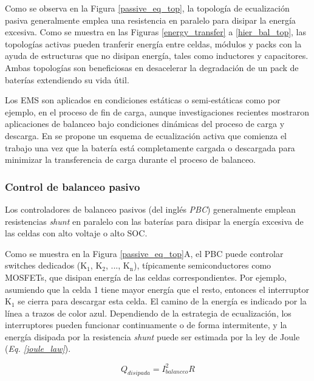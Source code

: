 \documentclass[10pt,a4paper]{article}
\begin{document}
Como se observa en la Figura \ref{passive_eq_top}, la topolog\'ia de
ecualizaci\'on pasiva generalmente emplea una resistencia en paralelo para
disipar la energ\'ia excesiva. Como se muestra en las Figuras
\ref{energy_transfer} a \ref{hier_bal_top}, las topolog\'ias activas pueden
tranferir energ\'ia entre celdas, m\'odulos y packs con la ayuda de estructuras
que no disipan energ\'ia, tales como inductores y capacitores. Ambas
topolog\'ias son beneficiosas en desacelerar la degradaci\'on de un pack de
bater\'ias extendiendo su vida \'util.

Los \acrshort{EMS} son aplicados en condiciones est\'aticas o semi-est\'aticas 
como por ejemplo, en el proceso de fin de carga, aunque investigaciones 
recientes mostraron aplicaciones de balanceo bajo condiciones din\'amicas del 
proceso de carga y descarga. En \cite{shen_cell_bal} se propone un esquema de 
ecualizaci\'on activa que comienza el trabajo una vez que la bater\'ia est\'a
completamente cargada o descargada para minimizar la transferencia de carga 
durante el proceso de balanceo.

\subsubsection{Control de balanceo pasivo}

Los controladores de balanceo pasivos (del ingl\'es
\emph{\acrfull{PBC}}) generalmente emplean resistencias \emph{shunt} en paralelo
con las bater\'ias para disipar la energ\'ia excesiva de las celdas con alto
voltaje o alto \acrshort{SOC}.

Como se muestra en la Figura \ref{passive_eq_top}A, el \acrshort{PBC} puede
controlar switches dedicados ($\mathrm{K_1}$, $\mathrm{K_2}$, ...,
$\mathrm{K_n}$), t\'ipicamente semiconductores como MOSFETs, que disipan
energ\'ia de las celdas correspondientes. Por ejemplo, asumiendo que la celda 1
tiene mayor energ\'ia que el resto, entonces el interruptor $\mathrm{K_1}$ se 
cierra para descargar esta celda. El camino de la energ\'ia es indicado por la 
línea a trazos de color azul. Dependiendo de la estrategia de ecualizaci\'on, 
los interruptores pueden funcionar continuamente o de forma intermitente, y la
energ\'ia disipada por la resistencia \emph{shunt} puede ser estimada por la
ley de Joule (\emph{Eq. \ref{joule_law}}).

\begin{equation}
    Q_{disipada} = I^2_{balanceo}R \label{joule_law}
\end{equation}
\end{document}
